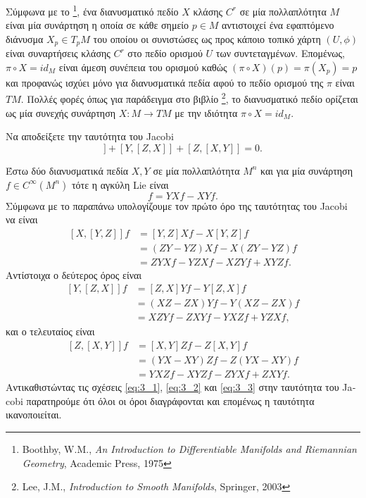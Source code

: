 \documentclass[a4paper,11pt]{article}
\newcommand{\tl}[1]{\textlatin{#1}}
\newenvironment{exercise}[2][Άσκηση]
{\begin{trivlist}
    \item[\hskip \labelsep {\bfseries #1}\hskip \labelsep {\bfseries #2.}]}
{\end{trivlist}}
\newenvironment{solution}[2][Λύση]
{\begin{trivlist}
    \item[\hskip \labelsep {\bfseries #1}\hskip \labelsep {\bfseries #2.}]}
{\end{trivlist}}
\begin{document}
\begin{solution}{2}
    Σύμφωνα με το \footnote{\tl{Boothby, W.M., \emph{An Introduction to Differentiable
    Manifolds and Riemannian Geometry}, Academic Press, 1975}},
    ένα διανυσματικό πεδίο $X$ κλάσης $C^r$ σε μία πολλαπλότητα $M$
    είναι μία συνάρτηση η οποία σε κάθε σημείο $p \in M$ αντιστοιχεί ένα
    εφαπτόμενο διάνυσμα $X_p \in T_pM$ του οποίου οι συνιστώσες ως προς
    κάποιο τοπικό χάρτη $(U, \phi)$ είναι συναρτήσεις κλάσης $C^r$ στο πεδίο
    ορισμού $U$ των συντεταγμένων. Επομένως, $\pi \circ X = id_M$ είναι άμεση
    συνέπεια του ορισμού καθώς $(\pi \circ X)(p) = \pi(X_p) = p$ και προφανώς
    ισχύει μόνο για διανυσματικά πεδία αφού το πεδίο ορισμού της $\pi$ είναι
    $TM$. Πολλές φορές όπως για παράδειγμα στο βιβλίο \footnote{\tl{Lee, J.M., \emph{Introduction to
    Smooth Manifolds}, Springer, 2003}}, το διανυσματικό πεδίο ορίζεται ως μία συνεχής
    συνάρτηση $X: M \rightarrow TM$ με την ιδιότητα $\pi \circ X = id_M$.
\end{solution}
\begin{exercise}{3}
    Να αποδείξετε την ταυτότητα του \tl{Jacobi}
    \begin{equation*}
        [X, [Y, Z]] + [Y, [Z, X]] + [Z, [X, Y]] = 0.
    \end{equation*}
\end{exercise}
\begin{solution}{3}
    Έστω δύο διανυσματικά πεδία $X,Y$ σε μία πολλαπλότητα $M^n$ και για μία συνάρτηση
    $f \in C^{\infty}(M^n)$ τότε η αγκύλη \tl{Lie} είναι
    \begin{equation*}
        [X, Y]f = YXf - XYf.
    \end{equation*}
    Σύμφωνα με το παραπάνω υπολογίζουμε τον πρώτο όρο της ταυτότητας του
    \tl{Jacobi} να είναι
    \begin{align}\label{eq:3_1}
        [X, [Y, Z]]f &= [Y, Z]Xf - X[Y, Z]f\nonumber \\
        &= (ZY - YZ)Xf - X(ZY - YZ)f \nonumber \\
        &= ZYXf - YZXf - XZYf + XYZf.
    \end{align}
    Αντίστοιχα ο δεύτερος όρος είναι
    \begin{align}\label{eq:3_2}
        [Y, [Z, X]]f &= [Z, X]Yf - Y[Z, X]f\nonumber \\
        &= (XZ - ZX)Yf - Y(XZ - ZX)f \nonumber \\
        &= XZYf - ZXYf - YXZf + YZXf,
    \end{align}
    και ο τελευταίος είναι
    \begin{align}\label{eq:3_3}
        [Z, [X, Y]]f &= [X, Y]Zf - Z[X, Y]f\nonumber \\
        &= (YX - XY)Zf - Z(YX - XY)f \nonumber \\
        &= YXZf - XYZf - ZYXf + ZXYf.
    \end{align}
    Αντικαθιστώντας τις σχέσεις \eqref{eq:3_1}, \eqref{eq:3_2} και
    \eqref{eq:3_3} στην ταυτότητα του \tl{Jacobi} παρατηρούμε ότι όλοι οι όροι
    διαγράφονται και επομένως η ταυτότητα ικανοποιείται.
\end{solution}
\end{document}

